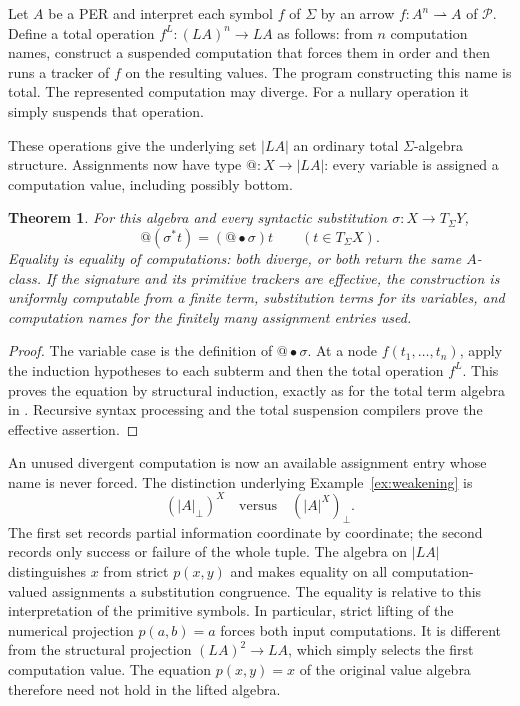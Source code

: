 \documentclass[11pt]{article}
\makeatletter
\newtheorem{theorem}{Theorem}[section]
\theoremstyle{definition}
\newcommand{\Pcat}{\mathcal P}
\newcommand{\ats}{\mathord{@}}
\makeatother
\begin{document}
Let $A$ be a PER and interpret each symbol $f$ of $\Sigma$ by an
arrow $f:A^n\rightharpoonup A$ of $\Pcat$. Define a total
operation $f^L:(LA)^n\to LA$ as follows: from $n$ computation
names, construct a suspended computation that forces them in order
and then runs a tracker of $f$ on the resulting values. The program
constructing this name is total. The represented computation may
diverge. For a nullary operation it simply suspends that operation.

These operations give the underlying set $|LA|$ an ordinary total
$\Sigma$-algebra structure. Assignments now have type
$\ats:X\to|LA|$: every variable is assigned a computation value,
including possibly bottom.

\begin{theorem}\label{thm:computation-substitution}
For this algebra and every syntactic substitution
$\sigma:X\to T_\Sigma Y$,
\[
 \ats(\sigma^*t)=(\ats\bullet\sigma)t
 \qquad(t\in T_\Sigma X).
\]
Equality is equality of computations: both diverge, or both return
the same $A$-class. If the signature and its primitive trackers are
effective, the construction is uniformly computable from a finite term,
substitution terms for its variables, and computation names for the
finitely many assignment entries used.
\end{theorem}
\begin{proof}
The variable case is the definition of $\ats\bullet\sigma$.
At a node $f(t_1,\ldots,t_n)$, apply the induction hypotheses to
each subterm and then the total operation $f^L$. This proves the
equation by structural induction, exactly as for the total term
algebra in \cite{Notation}. Recursive syntax processing and the
total suspension compilers prove the effective assertion.
\end{proof}

An unused divergent computation is now an available assignment entry
whose name is never forced. The distinction underlying
Example~\ref{ex:weakening} is
\[
 (|A|_\bot)^X\quad\text{versus}\quad(|A|^X)_\bot.
\]
The first set records partial information coordinate by coordinate;
the second records only success or failure of the whole tuple. The
algebra on $|LA|$ distinguishes $x$ from strict $p(x,y)$ and makes
equality on all computation-valued assignments a substitution
congruence. The equality is relative to this interpretation of the
primitive symbols. In particular, strict lifting of the numerical
projection $p(a,b)=a$ forces both input computations. It is different
from the structural projection $(LA)^2\to LA$, which simply selects
the first computation value. The equation $p(x,y)=x$ of the original
value algebra therefore need not hold in the lifted algebra.
\end{document}
